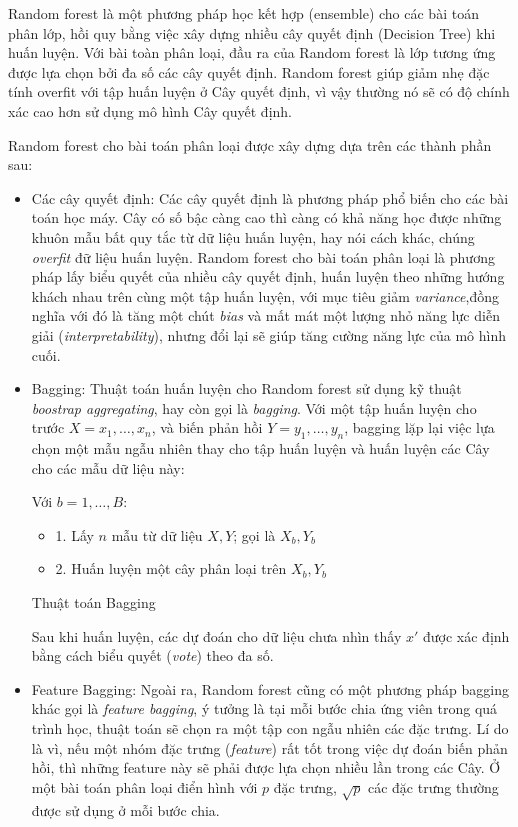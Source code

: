 Random forest là một phương pháp học kết hợp (ensemble) cho các bài toán phân lớp, hồi quy bằng việc xây dựng nhiều cây quyết định (Decision Tree) khi huấn luyện. Với bài toàn phân loại, đầu ra của Random forest là lớp tương ứng được lựa chọn bởi đa số các cây quyết định. Random forest giúp giảm nhẹ đặc tính overfit với tập huấn luyện ở Cây quyết định, vì vậy thường nó sẽ có độ chính xác cao hơn sử dụng mô hình Cây quyết định.

Random forest cho bài toán phân loại được xây dựng dựa trên các thành phần sau:
\begin{itemize}
    \item Các cây quyết định:
          Các cây quyết định là phương pháp phổ biến cho các bài toán học máy. Cây có số bậc càng cao thì càng có khả năng học được những khuôn mẫu bất quy tắc từ dữ liệu huấn luyện, hay nói cách khác, chúng \emph{overfit} đữ liệu huấn luyện. Random forest cho bài toán phân loại là phương pháp lấy biểu quyết của nhiều cây quyết định, huấn luyện theo những hướng khách nhau trên cùng một tập huấn luyện, với mục tiêu giảm \emph{variance},đồng nghĩa với đó là tăng một chút \emph{bias} và mất mát một lượng nhỏ năng lực diễn giải (\emph{interpretability}), nhưng đổi lại sẽ giúp tăng cường năng lực của mô hình cuối.
    \item Bagging: Thuật toán huấn luyện cho Random forest sử dụng kỹ thuật \emph{boostrap aggregating}, hay còn gọi là \emph{bagging}. Với một tập huấn luyện cho trước $X = x_1,\dots,x_n$, và biến phản hồi $Y=y_1,\dots,y_n$, bagging lặp lại việc lựa chọn một mẫu ngẫu nhiên thay cho tập huấn luyện và huấn luyện các Cây cho các mẫu dữ liệu này:
          \begin{algorithm}[h!]
              \DontPrintSemicolon
              Với $b = 1,\dots,B:$
              \begin{itemize}
                  \item 1. Lấy $n$ mẫu từ dữ liệu $X, Y$; gọi là $X_b, Y_b$
                  \item 2. Huấn luyện một cây phân loại trên $X_b, Y_b$
              \end{itemize}
              \caption{Thuật toán Bagging}
              \label{alg:Bagging}
          \end{algorithm}
          Sau khi huấn luyện, các dự đoán cho dữ liệu chưa nhìn thấy $x'$ được xác định bằng cách biểu quyết (\emph{vote}) theo đa số.
    \item Feature Bagging: 
          Ngoài ra, Random forest cũng có một phương pháp bagging khác gọi là \emph{feature bagging}, ý tưởng là tại mỗi bước chia ứng viên trong quá trình học, thuật toán sẽ chọn ra một tập con ngẫu nhiên các đặc trưng. Lí do là vì, nếu một nhóm đặc trưng (\emph{feature}) rất tốt trong việc dự đoán biến phản hồi, thì những feature này sẽ phải được lựa chọn nhiều lần trong các Cây. Ở một bài toán phân loại điển hình với $p$ đặc trưng, $\sqrt{p}$ các đặc trưng thường được sử dụng ở mỗi bước chia. 
\end{itemize}
